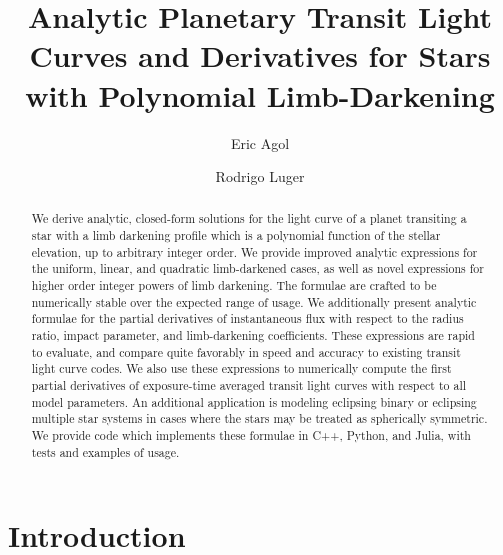 \documentclass[modern]{aastex61}
\begin{document}

\setlength{\abovedisplayskip}{1.5em}
\setlength{\belowdisplayskip}{1.5em}

\title{%
Analytic Planetary Transit Light Curves and Derivatives for Stars with Polynomial Limb-Darkening
}


\author[0000-0002-0802-9145]{Eric Agol}
\author[0000-0002-0296-3826]{Rodrigo Luger}


\begin{abstract}
 We derive analytic, closed-form solutions for the light curve of a planet
 transiting a star with a limb darkening profile which is a polynomial function
 of the stellar elevation, up to arbitrary integer order. 
 We provide improved analytic expressions for the uniform, linear, and quadratic
 limb-darkened cases, as well as novel expressions for higher order integer powers 
 of limb darkening.  The formulae are crafted to be numerically stable over the 
 expected range of usage.  We additionally present analytic formulae for
 the partial derivatives of instantaneous flux with respect to the radius ratio,
 impact parameter, and limb-darkening coefficients.  These expressions are rapid to
 evaluate, and compare quite favorably in speed and accuracy to existing transit light
 curve codes. We also use these expressions to numerically compute the first partial 
 derivatives of exposure-time averaged transit light curves with respect to all 
 model parameters.  An additional application is modeling eclipsing binary or
 eclipsing multiple star systems in cases where the stars may be treated as spherically 
 symmetric.  We provide code which implements these formulae in C++, Python, and Julia, 
 with tests and examples of usage.
\end{abstract}

%
\section{Introduction}
\label{sec:intro}
\end{document}
